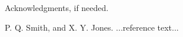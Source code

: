 \documentclass[preprint]{sigplanconf}
\begin{document}


\acks

Acknowledgments, if needed.





\begin{thebibliography}{}
\softraggedright

P. Q. Smith, and X. Y. Jones. ...reference text...





\end{thebibliography}
\end{document}

